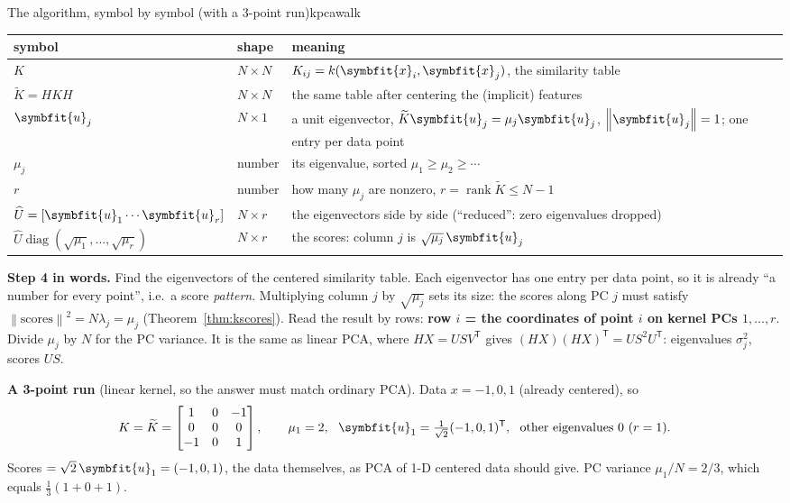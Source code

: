 \documentclass[11pt]{article}
\newcommand{\bm}[1]{\symbfit{#1}}
\newcommand{\vx}{\bm{x}}
\newcommand{\vu}{\bm{u}}
\newcommand{\T}{^{\mathsf T}}
\newcommand{\rank}{\operatorname{rank}}
\newcommand{\diag}{\operatorname{diag}}
\newcommand{\norm}[1]{\left\lVert #1\right\rVert}
\begin{document}
\begin{example}{The algorithm, symbol by symbol (with a 3-point run)}{kpcawalk}
\begin{center}
\renewcommand{\arraystretch}{1.3}
\small
\begin{tabular}{@{}l>{\raggedright\arraybackslash}p{2.3cm}>{\raggedright\arraybackslash}p{8.4cm}@{}}
\toprule
symbol & shape & meaning \\
\midrule
$K$ & $N\times N$ & $K_{ij}=k(\vx_i,\vx_j)$, the similarity table \\
$\widetilde K=HKH$ & $N\times N$ & the same table after centering the (implicit) features \\
$\vu_j$ & $N\times1$ & a unit eigenvector, $\widetilde K\vu_j=\mu_j\vu_j$, $\norm{\vu_j}=1$; one entry per data point \\
$\mu_j$ & number & its eigenvalue, sorted $\mu_1\ge\mu_2\ge\cdots$ \\
$r$ & number & how many $\mu_j$ are nonzero, $r=\rank\widetilde K\le N-1$ \\
$\widehat U=[\vu_1\cdots\vu_r]$ & $N\times r$ & the eigenvectors side by side (``reduced'': zero eigenvalues dropped) \\
$\widehat U\diag(\sqrt{\mu_1},\dots,\sqrt{\mu_r})$ & $N\times r$ & the scores: column $j$ is $\sqrt{\mu_j}\,\vu_j$ \\
\bottomrule
\end{tabular}
\end{center}
\textbf{Step 4 in words.} Find the eigenvectors of the centered similarity table. Each eigenvector has one entry per
data point, so it is already ``a number for every point'', i.e.\ a score \emph{pattern}. Multiplying column $j$ by $\sqrt{\mu_j}$
sets its size: the scores along PC $j$ must satisfy $\norm{\text{scores}}^2=N\lambda_j=\mu_j$ (Theorem~\ref{thm:kscores}). Read the
result by rows: \textbf{row $i$ = the coordinates of point $i$ on kernel PCs $1,\dots,r$}. Divide $\mu_j$ by $N$ for the PC
variance. It is the same as linear PCA, where $HX=USV\T$ gives $(HX)(HX)\T=US^2U\T$: eigenvalues $\sigma_j^2$, scores $US$.

\textbf{A 3-point run} (linear kernel, so the answer must match ordinary PCA). Data $x=-1,0,1$ (already centered), so
\[
K=\widetilde K=\begin{bmatrix}1&0&-1\\0&0&0\\-1&0&1\end{bmatrix},\qquad \mu_1=2,\ \ \vu_1=\tfrac1{\sqrt2}(-1,0,1)\T,\ \ \text{other eigenvalues }0\ (r=1).
\]
Scores $=\sqrt2\,\vu_1=(-1,0,1)$, the data themselves, as PCA of 1-D centered data should give. PC variance $\mu_1/N=2/3$,
which equals $\tfrac13(1+0+1)$. \checkmark
\end{example}
\end{document}
